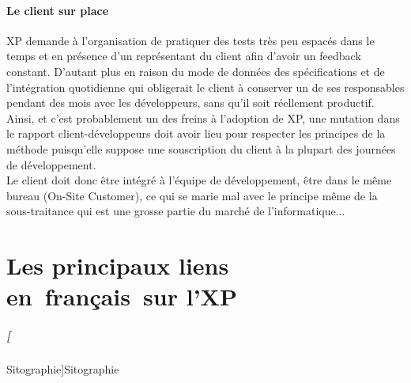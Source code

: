\documentclass[]{article}
\let\oldparagraph\paragraph
\renewcommand{\paragraph}[1]{\oldparagraph{#1}\mbox{}}
\let\oldsubparagraph\subparagraph
\renewcommand{\subparagraph}[1]{\oldsubparagraph{#1}\mbox{}}
\begin{document}
\hypertarget{le-client-sur-place}{%
\paragraph{Le client sur place}\label{le-client-sur-place}}

XP demande à l'organisation de pratiquer des tests très peu espacés dans
le temps et en présence d'un représentant du client afin d'avoir un
feedback constant. D'autant plus en raison du mode de données des
spécifications et de l'intégration quotidienne qui obligerait le client
à conserver un de ses responsables pendant des mois avec les
développeurs, sans qu'il soit réellement productif.\\
Ainsi, et c'est probablement un des freins à l'adoption de XP, une
mutation dans le rapport client-développeurs doit avoir lieu pour
respecter les principes de la méthode puisqu'elle suppose une
souscription du client à la plupart des journées de développement.\\
Le client doit donc être intégré à l'équipe de développement, être dans
le même bureau (On-Site Customer), ce qui se marie mal avec le principe
même de la sous-traitance qui est une grosse partie du marché de
l'informatique...





















\section{Les principaux liens en~français~sur l'XP}


\hypertarget{sitographie}{%
\subparagraph[Sitographie]{\texorpdfstring{\protect\hypertarget{Sitographie}{}{}Sitographie}{Sitographie}}\label{sitographie}}
\end{document}
